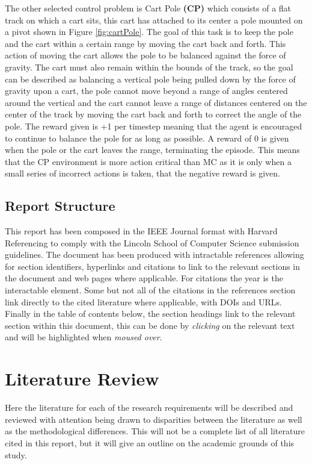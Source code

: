 \documentclass[hidelinks,journal]{IEEEtran}
\begin{document}
The other selected control problem is Cart Pole \textbf{(CP)} which consists of a flat track on which a cart sits, this cart has attached to its center a pole mounted on a pivot shown in Figure \ref{fig:cartPole}. The goal of this task is to keep the pole and the cart within a certain range by moving the cart back and forth. This action of moving the cart allows the pole to be balanced against the force of gravity. The cart must also remain within the bounds of the track, so the goal can be described as balancing a vertical pole being pulled down by the force of gravity upon a cart, the pole cannot move beyond a range of angles centered around the vertical and the cart cannot leave a range of distances centered on the center of the track by moving the cart back and forth to correct the angle of the pole. The reward given is +1 per timestep meaning that the agent is encouraged to continue to balance the pole for as long as possible. A reward of 0 is given when the pole or the cart leaves the range, terminating the episode. This means that the CP environment is more action critical than MC as it is only when a small series of incorrect actions is taken, that the negative reward is given.
\subsection{Report Structure}
\label{subsec:intReportStructure}
This report has been composed in the IEEE Journal format with Harvard Referencing to comply with the Lincoln School of Computer Science submission guidelines. The document has been produced with intractable references allowing for section identifiers, hyperlinks and citations to link to the relevant sections in the document and web pages where applicable. For citations the year is the interactable element. Some but not all of the citations in the references section link directly to the cited literature where applicable, with DOIs and URLs. Finally in the table of contents below, the section headings link to the relevant section within this document, this can be done by \textit{clicking} on the relevant text and will be highlighted when \textit{moused over}.

\tableofcontents{}

\section{Literature Review}
\label{sec:literature}
Here the literature for each of the research requirements will be described and reviewed with attention being drawn to disparities between the literature as well as the methodological differences. This will not be a complete list of all literature cited in this report, but it will give an outline on the academic grounds of this study.
\end{document}
